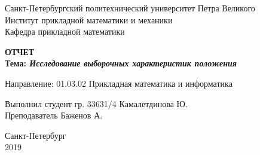 \begin{titlepage}

\begin{center}
Санкт-Петербургский политехнический университет Петра Великого\\
Институт прикладной математики и механики\\
Кафедра прикладной математики\\
\end{center}


\vspace{2.5cm}

\begin{center}
{\large {\bfseries ОТЧЕТ}}\\

\bigskip \bfseries{Тема:} {\bfseries \emph{Исследование выборочных характеристик положения}}
\end{center}

\vspace{1.5cm}

\begin{flushleft}
Направление: 01.03.02 Прикладная математика и информатика

\vspace{1.5cm}

Выполнил студент гр. 33631/4 \hfill{Камалетдинова Ю.} \\ 

\vspace{0.5cm} Преподаватель \hfill{Баженов А.}
\vspace{1cm}

\end{flushleft}

\vspace{2.7cm}

\begin{center}
Санкт-Петербург\\
2019
\end{center}

\end{titlepage}
